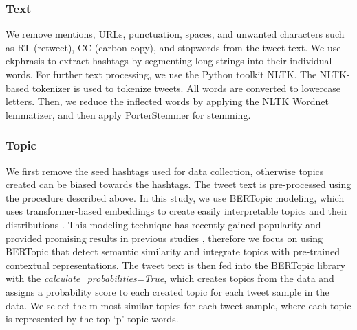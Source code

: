 \documentclass[letterpaper]{article}
\begin{document}
\subsubsection{Text}  We remove mentions, URLs, punctuation, spaces, and unwanted characters such as RT (retweet), CC (carbon copy), and stopwords from the tweet text. We use ekphrasis \cite{baziotis2017datastories} to extract hashtags by segmenting long strings into their individual words. For further text processing, we use the Python toolkit NLTK. The NLTK-based tokenizer is used to tokenize tweets. All words are converted to lowercase letters. Then, we reduce the inflected words by applying the NLTK Wordnet lemmatizer, and then apply PorterStemmer for stemming.
\subsubsection{Topic} We first remove the seed hashtags used for data collection, otherwise topics created can be biased towards the hashtags. The tweet text is pre-processed using the procedure described above. In this study, we use BERTopic modeling, which uses transformer-based embeddings to create easily interpretable topics and their distributions \cite{grootendorst2020bertopic}. This modeling technique has recently gained popularity and provided promising results in previous studies \cite{anwar2021analyzing}, therefore we focus on using BERTopic that detect semantic similarity and integrate topics with pre-trained contextual representations. The tweet text is then fed into the BERTopic library with the \textit{calculate\_probabilities=True}, which creates topics from the data and assigns a probability score to each created topic for each tweet sample in the data. We select the m-most similar topics for each tweet sample, where each topic is represented by the top `p' topic words.
\end{document}
